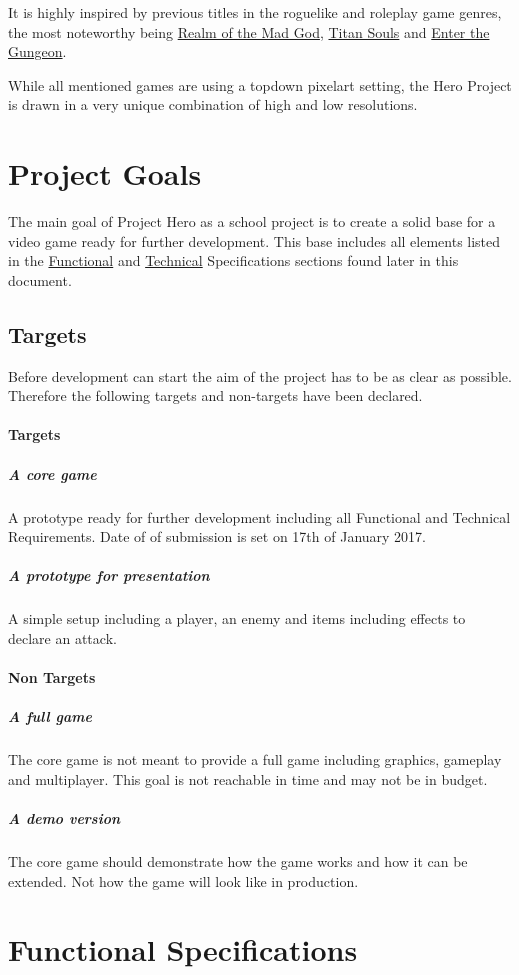 \documentclass[11pt]{article}
\begin{document}
It is highly inspired by previous titles in the roguelike and roleplay game genres, the most noteworthy being \href{https://realmofthemadgod.com}{Realm of the Mad God}, \href{http://www.devolverdigital.com/games/view/titan-souls}{Titan Souls} and \href{http://dodgeroll.com/gungeon/}{Enter the Gungeon}.

While all mentioned games are using a topdown pixelart setting, the Hero Project is drawn in a very unique combination of high and low resolutions.

\section{Project Goals}
The main goal of Project Hero as a school project is to create a solid base for a video game ready for further development.
This base includes all elements listed in the \hyperref[sec:fs]{Functional} and \hyperref[sec:ts]{Technical} Specifications sections found later in this document.

\subsection{Targets}
Before development can start the aim of the project has to be as clear as possible. Therefore the following targets and non-targets have been declared.
\paragraph{Targets}
\subparagraph{A core game} A prototype ready for further development including all Functional and Technical Requirements. Date of of submission is set on 17th of January 2017.
\subparagraph{A prototype for presentation} A simple setup including a player, an enemy and items including effects to declare an attack.

\paragraph{Non Targets}
\subparagraph{A full game} The core game is not meant to provide a full game including graphics, gameplay and multiplayer. This goal is not reachable in time and may not be in budget.
\subparagraph{A demo version} The core game should demonstrate how the game works and how it can be extended. Not how the game will look like in production.

\newpage

\section{Functional Specifications}\label{sec:fs}
\end{document}
